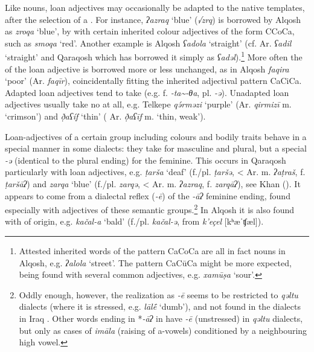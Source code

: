 \documentclass[output=paper]{langsci/langscibook}
\begin{document}
Like nouns, loan adjectives may occasionally be adapted to the native  templates, after the selection of a . For instance,  \textit{ʔazraq} ‘blue’ (\textit{√zrq}) is borrowed by  Alqosh as \textit{zroqa} ‘blue’, by  with certain inherited colour adjectives of the form CCoCa, such as \textit{smoqa} ‘red’. Another example is  Alqosh \textit{ʕadola} ‘straight’ (cf.  Ar. \textit{ʕadil} ‘straight’ and  Qaraqosh which has borrowed it simply as \textit{ʕadəl}).\footnote{Attested inherited words of the pattern CaCoCa are all in fact nouns in  Alqosh, e.g. \textit{ʔalola} ‘street’. The pattern CaCūCa might be more expected, being found with several common adjectives, e.g. \textit{xamūṣa} ‘sour’.} More often the  of the loan adjective is borrowed more or less unchanged, as in  Alqosh \textit{faqira} ‘poor’ (Ar. \textit{faqīr}), coincidentally fitting the inherited adjectival pattern CaCiCa. Adapted loan adjectives tend to take   (e.g. f. \textit{{}-ta{\textasciitilde}-θa}, pl. \textit{{}-ə}). Unadapted loan adjectives usually take no  at all, e.g.  Telkepe \textit{qə́rməzi} ‘purple’ (Ar. \textit{qirmizī} m. ‘crimson’) and \textit{ð̣aʕíf} ‘thin’ ( Ar. \textit{ð̣aʕīf} m. ‘thin, weak’).

Loan-adjectives of a certain group including colours and bodily traits behave in a special manner in some  dialects: they take   for masculine and plural, but a special  \textit{\nobreakdash-ə} (identical to the plural ending) for the feminine. This occurs in  Qaraqosh particularly with  loan adjectives, e.g. \textit{ṭarša} ‘deaf’ (f./pl. \textit{ṭaršə}, < Ar. m. \textit{ʔaṭraš}, f. \textit{ṭaršāʔ}) and \textit{zarqa} ‘blue’ (f./pl. \textit{zarqə}, < Ar. m. \textit{ʔazraq}, f. \textit{zarqāʔ}), see Khan (\citeyear[219]{Khan2002}). It appears to come from a dialectal reflex (\textit{\nobreakdash-ē}) of the  \textit{\nobreakdash-āʔ} feminine ending, found especially with adjectives of these semantic groups.\footnote{Oddly enough, however, the realization as \textit{-ē} seems to be restricted to  \textit{qəltu}  dialects (where it is stressed, e.g.  \textit{lāl\'{ē}} ‘dumb’), and not found in the dialects in Iraq \citep[76]{Jastrow1978}. Other words ending in *\textit{{}-āʔ} in have \textit{{}-ē} (unstressed) in \textit{qəltu}  dialects, but only as cases of \textit{imāla} (raising of a-vowels) conditioned by a neighbouring high vowel.}  In  Alqosh it is also found with  of   origin, e.g. \textit{kačal-a} ‘bald’ (f./pl. \textit{kačal\nobreakdash-ə}, from  \textit{k’eçel} [kʰæˈʧæl]).
\end{document}
